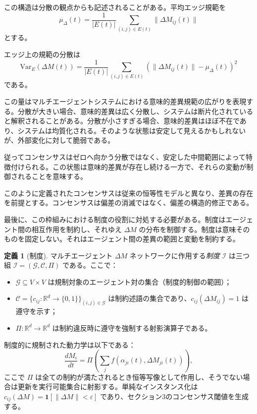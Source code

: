 \documentclass[11pt,a4paper]{article}
\theoremstyle{definition}
\newtheorem{definition}{定義}[section]
\begin{document}
この構造は分散の観点からも記述されることがある。平均エッジ規範を
\[
\mu_\Delta(t) = \frac{1}{|E(t)|} \sum_{(i,j) \in E(t)} \|\Delta M_{ij}(t)\|
\]
とする。

エッジ上の規範の分散は
\[
\text{Var}_E(\Delta M(t)) = \frac{1}{|E(t)|} \sum_{(i,j) \in E(t)} (\|\Delta M_{ij}(t)\| - \mu_\Delta(t))^2
\]
である。

この量はマルチエージェントシステムにおける意味的差異規範の広がりを表現する。分散が大きい場合、意味的差異は広く分散し、システムは断片化されていると解釈されることがある。分散が小さすぎる場合、意味的差異はほぼ不在であり、システムは均質化される。そのような状態は安定して見えるかもしれないが、外部変化に対して脆弱である。

従ってコンセンサスはゼロへ向かう分散ではなく、安定した中間範囲によって特徴付けられる。この状態は意味的差異が存在し続ける一方で、それらの変動が制御されることを意味する。

このように定義されたコンセンサスは従来の恒等性モデルと異なり、差異の存在を前提とする。コンセンサスは偏差の消滅ではなく、偏差の構造的修正である。

最後に、この枠組みにおける制度の役割に対処する必要がある。制度はエージェント間の相互作用を制約し、それゆえ $\Delta M$ の分布を制御する。制度は意味そのものを固定しない。それはエージェント間の差異の範囲と変動を制約する。

\begin{definition}[制度]
マルチエージェント $\Delta M$ ネットワークに作用する\textit{制度} $\mathcal{I}$ は三つ組 $\mathcal{I} = (\mathcal{G}, \mathcal{C}, \Pi)$ である。ここで：
\begin{itemize}
\item $\mathcal{G} \subseteq V \times V$ は規制対象のエージェント対の集合（制度的制御の範囲）；
\item $\mathcal{C} = \{c_{ij} : \mathbb{R}^d \to \{0, 1\}\}_{(i,j) \in \mathcal{G}}$ は制約述語の集合であり、$c_{ij}(\Delta M_{ij}) = 1$ は遵守を示す；
\item $\Pi : \mathbb{R}^d \to \mathbb{R}^d$ は制約違反時に遵守を強制する射影演算子である。
\end{itemize}

制度的に規制された動力学は以下である：
\[
\frac{dM_i}{dt} = \Pi\!\left(\sum_j f(\alpha_{ji}(t), \Delta M_{ji}(t))\right),
\]
ここで $\Pi$ は全ての制約が満たされるとき恒等写像として作用し、そうでない場合は更新を実行可能集合に射影する。単純なインスタンス化は $c_{ij}(\Delta M) = \mathbf{1}[\|\Delta M\| < \varepsilon]$ であり、セクション3のコンセンサス閾値を生成する。
\end{definition}
\end{document}
